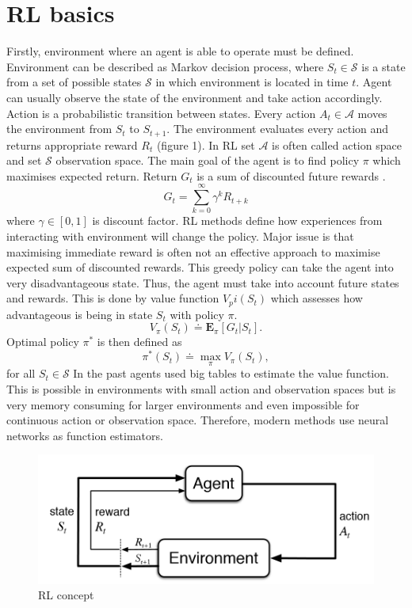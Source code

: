 \section{RL basics}
Firstly, environment where an agent is able to operate must be defined. Environment can be described as Markov decision process, where $S_t \in \mathcal{S}$ is a state from a set of possible states $\mathcal{S}$ in which environment is located in time $t$. Agent can usually observe the state of the environment and take action accordingly. Action is a probabilistic transition between states. Every action $A_t \in \mathcal{A}$ moves the environment from $S_t$ to $S_{t+1}$. The environment evaluates every action and returns appropriate reward $R_t$ (figure 1). In RL set $\mathcal{A}$ is often called action space and set $\mathcal{S}$ observation space. The main goal of the agent is to find policy $\pi$ which maximises expected return. Return $G_t$ is a sum of discounted future rewards \cite{sutton2012}.
\begin{equation}
G_t = \sum\limits_{k=0}^{\infty}\gamma^k R_{t+k}
\end{equation}
where $\gamma \in [0,1]$ is discount factor. RL methods define how experiences from interacting with environment will change the policy.  Major issue is that maximising immediate reward is often not an effective approach to maximise expected sum of discounted rewards. This greedy policy can take the agent into very disadvantageous state. Thus, the agent must take into account future states and rewards. This is done by value function $V_pi(S_t)$ which assesses how advantageous is being in state $S_t$ with policy $\pi$.
\begin{equation}
V_\pi(S_t) \doteq  \mathbf{E}_\pi[G_t | S_t].
\end{equation}
Optimal policy $\pi^*$ is then defined as
\begin{equation}
\pi^*(S_t) \doteq \max\limits_\pi V_\pi(S_t),
\end{equation}
for all $S_t \in \mathcal{S}$
In the past agents used big tables to estimate the value function. This is possible in environments with small action and observation spaces but is very memory consuming for larger environments and even impossible for continuous action or observation space. Therefore, modern methods use neural networks as function estimators.

\begin{figure}[!h]
\centering
\includegraphics[scale=0.3]{fig/RL-concept.png}
\caption{RL concept}
\end{figure}

